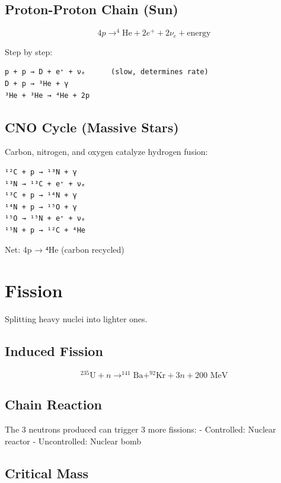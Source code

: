 \documentclass[
  11pt,
  letterpaper,
  twoside,
  openright]{book}
\begin{document}
\subsection{Proton-Proton Chain (Sun)}\label{proton-proton-chain-sun}

\[
4p \rightarrow ^{4}\text{He} + 2e^+ + 2\nu_e + \text{energy}
\]

Step by step:

\begin{verbatim}
p + p → D + e⁺ + νₑ      (slow, determines rate)
D + p → ³He + γ
³He + ³He → ⁴He + 2p
\end{verbatim}

\subsection{CNO Cycle (Massive Stars)}\label{cno-cycle-massive-stars}

Carbon, nitrogen, and oxygen catalyze hydrogen fusion:

\begin{verbatim}
¹²C + p → ¹³N + γ
¹³N → ¹³C + e⁺ + νₑ
¹³C + p → ¹⁴N + γ
¹⁴N + p → ¹⁵O + γ
¹⁵O → ¹⁵N + e⁺ + νₑ
¹⁵N + p → ¹²C + ⁴He
\end{verbatim}

Net: 4p → ⁴He (carbon recycled)

\section{Fission}\label{fission}

Splitting heavy nuclei into lighter ones.

\subsection{Induced Fission}\label{induced-fission}

\[
^{235}\text{U} + n \rightarrow ^{141}\text{Ba} + ^{92}\text{Kr} + 3n + 200 \text{ MeV}
\]

\subsection{Chain Reaction}\label{chain-reaction}

The 3 neutrons produced can trigger 3 more fissions: - Controlled:
Nuclear reactor - Uncontrolled: Nuclear bomb

\subsection{Critical Mass}\label{critical-mass}
\end{document}
